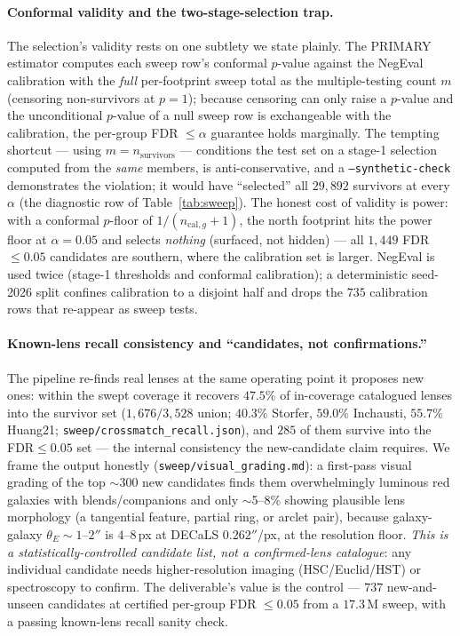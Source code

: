 \paragraph{Conformal validity and the two-stage-selection trap.} The selection's
validity rests on one subtlety we state plainly. The PRIMARY estimator computes each
sweep row's conformal $p$-value against the NegEval calibration with the
\emph{full} per-footprint sweep total as the multiple-testing count $m$
(censoring non-survivors at $p{=}1$); because censoring can only raise a $p$-value
and the unconditional $p$-value of a null sweep row is exchangeable with the
calibration, the per-group FDR $\le\alpha$ guarantee holds marginally. The tempting
shortcut --- using $m=n_{\mathrm{survivors}}$ --- conditions the test set on a
stage-1 selection computed from the \emph{same} members, is anti-conservative, and a
\texttt{--synthetic-check} demonstrates the violation; it would have ``selected''
all $29{,}892$ survivors at every $\alpha$ (the diagnostic row of
Table~\ref{tab:sweep}). The honest cost of validity is power: with a conformal
$p$-floor of $1/(n_{\mathrm{cal},g}{+}1)$, the north footprint hits the power floor
at $\alpha{=}0.05$ and selects \emph{nothing} (surfaced, not hidden) --- all
$1{,}449$ FDR$\le0.05$ candidates are southern, where the calibration set is
larger. NegEval is used twice (stage-1 thresholds and conformal calibration); a
deterministic seed-2026 split confines calibration to a disjoint half and drops the
$735$ calibration rows that re-appear as sweep tests.

\paragraph{Known-lens recall consistency and ``candidates, not confirmations.''}
The pipeline re-finds real lenses at the same operating point it proposes new ones:
within the swept coverage it recovers $47.5\%$ of in-coverage catalogued lenses into
the survivor set ($1{,}676/3{,}528$ union; $40.3\%$ Storfer, $59.0\%$ Inchausti,
$55.7\%$ Huang21; \texttt{sweep/crossmatch\_recall.json}), and $285$ of them survive
into the FDR$\le0.05$ set --- the internal consistency the new-candidate claim
requires. We frame the output honestly (\texttt{sweep/visual\_grading.md}): a
first-pass visual grading of the top $\sim$300 new candidates finds them
overwhelmingly luminous red galaxies with blends/companions and only $\sim$5--8\%
showing plausible lens morphology (a tangential feature, partial ring, or arclet
pair), because galaxy-galaxy $\theta_E\sim1$--$2''$ is $4$--$8$\,px at DECaLS
$0.262''$/px, at the resolution floor. \emph{This is a statistically-controlled
candidate list, not a confirmed-lens catalogue}: any individual candidate needs
higher-resolution imaging (HSC/Euclid/HST) or spectroscopy to confirm. The
deliverable's value is the control --- $737$ new-and-unseen candidates at certified
per-group FDR $\le0.05$ from a $17.3$\,M sweep, with a passing known-lens recall
sanity check.

